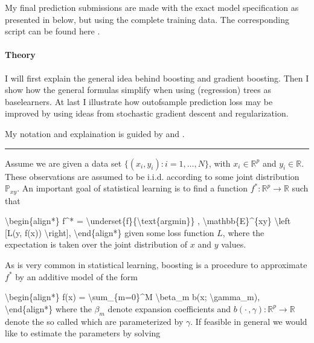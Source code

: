 \documentclass[letterpaper,10pt,english]{sphinxmanual}
\begin{document}
 My final prediction submissions are made with the exact model specification as presented in below, but using the complete training data. The corresponding script can be found here .


\paragraph{Theory}
\label{\detokenize{simulated_final:theory}}
I will first explain the general idea behind boosting and gradient boosting. Then I show how the general formulas simplify when using (regression) trees as base\sphinxhyphen{}learners. At last I illustrate how out\sphinxhyphen{}of\sphinxhyphen{}sample prediction loss may be improved by using ideas from stochastic gradient descent and regularization.

 My notation and explaination is guided by  and .


\bigskip\hrule\bigskip



Assume we are given a data set \(\{(x_i, y_i) : i=1,\dots,N\}\), with \(x_i \in \mathbb{R}^p\) and \(y_i \in \mathbb{R}\). These observations are assumed to be i.i.d. according to some joint distribution \(\mathbb{P}_{xy}\). An important goal of statistical learning is to find a function \(f^* : \mathbb{R}^p \to \mathbb{R}\) such that

\textbackslash{}begin\{align*\}
f\textasciicircum{}* = \textbackslash{}underset\{f\}\{\textbackslash{}text\{argmin\}\} , \textbackslash{}mathbb\{E\}\textasciicircum{}\{xy\} \textbackslash{}left {[}L(y, f(x)) \textbackslash{}right{]},
\textbackslash{}end\{align*\}
given some loss function \(L\), where the expectation is taken over the joint distribution of \(x\) and \(y\) values.

As is very common in statistical learning, boosting is a procedure to approximate \(f^*\) by an additive model of the form

\textbackslash{}begin\{align*\}
f(x) = \textbackslash{}sum\_\{m=0\}\textasciicircum{}M \textbackslash{}beta\_m b(x; \textbackslash{}gamma\_m),
\textbackslash{}end\{align*\}
where the \(\beta_m\) denote expansion coefficients and \(b(\cdot\,,\gamma) : \mathbb{R}^p \to \mathbb{R}\) denote the so called  which are parameterized by \(\gamma\). If feasible in general we would like to estimate the parameters by solving
\end{document}

